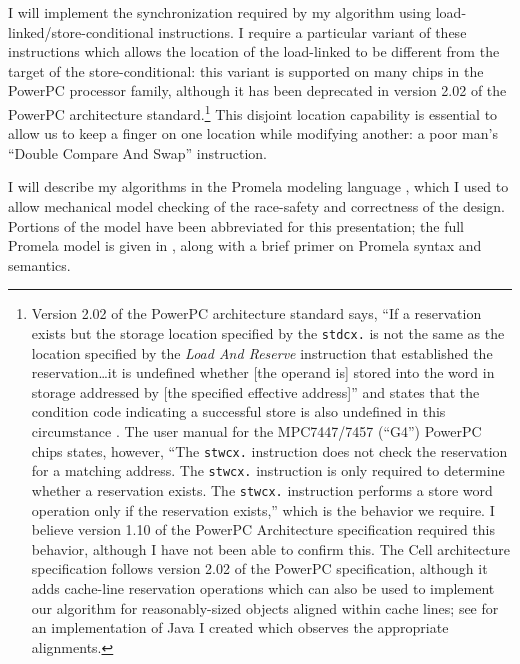 I will implement the synchronization required by my algorithm using
load-linked/store-conditional instructions.  I require a particular
variant of these instructions which allows the location of the
load-linked to be different from the target of the store-conditional:
this variant is supported on many chips in the PowerPC processor family,
although it has been deprecated in version 2.02 of the PowerPC
architecture standard.\footnote{Version 2.02 of the PowerPC
architecture standard says, ``If a reservation exists but the storage
location specified by the \texttt{stdcx.} is not the same as the
location specified by the \textit{Load And Reserve} instruction that
established the reservation\ldots it is undefined whether [the operand
is] stored into the word in storage addressed by [the specified
effective address]'' and states that the condition code indicating a
successful store is also undefined in this circumstance \cite[p 25]{PPCII202}.
The user manual for the MPC7447/7457 (``G4'') PowerPC chips states,
however, ``The \texttt{stwcx.} instruction does not check the
reservation for a matching address.  The \texttt{stwcx.} instruction
is only required to determine whether a reservation exists.  The
\texttt{stwcx.} instruction performs a store word operation only if
the reservation exists,'' \cite[Chapter 3.3.3.6]{MPC7450UM} which is
the behavior we require.  I believe version 1.10 of the PowerPC
Architecture specification required this behavior, although I have not
been able to confirm this.  The Cell architecture specification
follows version 2.02 of the PowerPC specification, although it adds
cache-line reservation operations which can also be used to
implement our algorithm for reasonably-sized objects aligned within
cache lines; see \cite{WitchelLaAnAs01} for an implementation of Java
I created which observes the appropriate alignments.}  This disjoint location
capability is essential to allow us to keep a finger on one location
while modifying another: a poor man's ``Double Compare And Swap''
instruction.

I will describe my algorithms in the Promela modeling language
\cite{Holzmann03},
which I used to allow mechanical model checking of the race-safety
and correctness of the design.  Portions of the model have been
abbreviated for this presentation;  the full Promela model is
given in , along with a brief primer on Promela
syntax and semantics.

